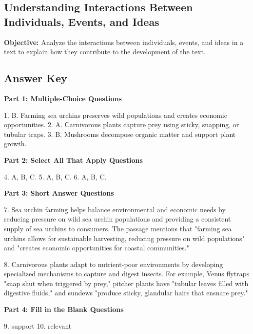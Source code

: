 \documentclass[12pt]{article}
\begin{document}
\subsection*{Understanding Interactions Between Individuals, Events, and Ideas}
\onehalfspacing

\begin{tcolorbox}[colframe=black!40, colback=gray!0, title=Learning Objective]
\textbf{Objective:} Analyze the interactions between individuals, events, and ideas in a text to explain how they contribute to the development of the text.
\end{tcolorbox}


\subsection*{Answer Key}

\textbf{Part 1: Multiple-Choice Questions}

1. B. Farming sea urchins preserves wild populations and creates economic opportunities.  
2. A. Carnivorous plants capture prey using sticky, snapping, or tubular traps.  
3. B. Mushrooms decompose organic matter and support plant growth.  

\textbf{Part 2: Select All That Apply Questions}

4. A, B, C.  
5. A, B, C.  
6. A, B, C.  

\textbf{Part 3: Short Answer Questions}

7. Sea urchin farming helps balance environmental and economic needs by reducing pressure on wild sea urchin populations and providing a consistent supply of sea urchins to consumers. The passage mentions that "farming sea urchins allows for sustainable harvesting, reducing pressure on wild populations" and "creates economic opportunities for coastal communities."

8. Carnivorous plants adapt to nutrient-poor environments by developing specialized mechanisms to capture and digest insects. For example, Venus flytraps "snap shut when triggered by prey," pitcher plants have "tubular leaves filled with digestive fluids," and sundews "produce sticky, glandular hairs that ensnare prey."

\textbf{Part 4: Fill in the Blank Questions}

9. support  
10. relevant  
\end{document}

